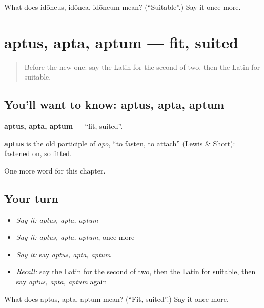 \begin{tcolorbox}[breakable,colback=teal!4,colframe=teal!35!black,title={Before you move on}]
What does idōneus, idōnea, idōneum mean? (\textquotedblleft{}Suitable\textquotedblright{}.) Say it once more.
\end{tcolorbox}
\section[aptus, apta, aptum]{aptus, apta, aptum — fit, suited}

\label{lesson:LA-C268-aptus}



\begin{quote}
Before the new one: say the Latin for the second of two, then the Latin for suitable.
\end{quote}

\subsection*{You'll want to know: aptus, apta, aptum}
\textbf{aptus, apta, aptum} — \textquotedblleft{}fit, suited\textquotedblright{}.

\begin{cousinweb}
\textbf{aptus} is the old participle of \emph{apō}, \textquotedblleft{}to fasten, to attach\textquotedblright{} (Lewis \& Short): fastened on, so fitted.
\end{cousinweb}

\begin{grammarlens}[title={What you've built}]
One more word for this chapter.
\end{grammarlens}

\subsection*{Your turn}
\begin{itemize}
\raggedright
  \item \emph{Say it:} \emph{aptus, apta, aptum}
  \item \emph{Say it:} \emph{aptus, apta, aptum}, once more
  \item \emph{Say it:} say \emph{aptus, apta, aptum}
  \item \emph{Recall:} say the Latin for the second of two, then the Latin for suitable, then say \emph{aptus, apta, aptum} again
\end{itemize}

\begin{tcolorbox}[breakable,colback=teal!4,colframe=teal!35!black,title={Before you move on}]
What does aptus, apta, aptum mean? (\textquotedblleft{}Fit, suited\textquotedblright{}.) Say it once more.
\end{tcolorbox}
